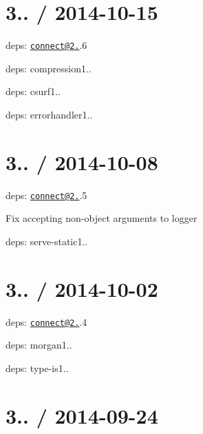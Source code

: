 \section*{3.. / 2014-\/10-\/15 }


\begin{DoxyItemize}
\item deps\+: \href{mailto:connect@2.26}{\tt connect@2.}.6
\begin{DoxyItemize}
\item deps\+: compression1..
\item deps\+: csurf1..
\item deps\+: errorhandler1..
\end{DoxyItemize}
\end{DoxyItemize}

\section*{3.. / 2014-\/10-\/08 }


\begin{DoxyItemize}
\item deps\+: \href{mailto:connect@2.26}{\tt connect@2.}.5
\begin{DoxyItemize}
\item Fix accepting non-\/object arguments to {\ttfamily logger}
\item deps\+: serve-\/static1..
\end{DoxyItemize}
\end{DoxyItemize}

\section*{3.. / 2014-\/10-\/02 }


\begin{DoxyItemize}
\item deps\+: \href{mailto:connect@2.26}{\tt connect@2.}.4
\begin{DoxyItemize}
\item deps\+: morgan1..
\item deps\+: type-\/is1..
\end{DoxyItemize}
\end{DoxyItemize}

\section*{3.. / 2014-\/09-\/24 }


